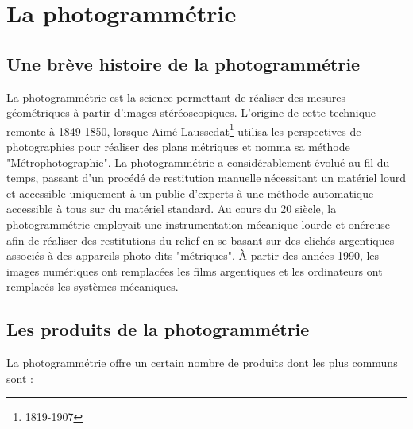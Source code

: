 \section{La photogrammétrie} 
\subsection{Une brève histoire de la photogrammétrie}

La photogrammétrie est la science permettant de réaliser des mesures géométriques à partir d'images stéréoscopiques. L'origine de cette technique remonte à 1849-1850, lorsque Aimé Laussedat\footnote{1819-1907} utilisa les perspectives de photographies pour réaliser des plans métriques et nomma sa méthode  "Métrophotographie". La photogrammétrie a considérablement évolué au fil du temps, passant d'un procédé de restitution manuelle nécessitant un matériel lourd et accessible uniquement à un public d'experts à une méthode automatique accessible à tous sur du matériel standard. Au cours du 20 siècle, la photogrammétrie employait une instrumentation mécanique lourde et onéreuse afin de réaliser des restitutions du relief en se basant sur des clichés argentiques associés à des appareils photo dits "métriques". À partir des années 1990, les images numériques ont remplacées les films argentiques et les ordinateurs ont remplacés les systèmes mécaniques.


\subsection{Les produits de la photogrammétrie}
La photogrammétrie offre un certain nombre de produits dont les plus communs sont :

